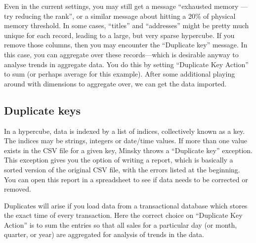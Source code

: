 Even in the current settings, you may still get a message ``exhausted
memory --- try reducing the rank'', or a similar message about hitting
a 20\% of physical memory threshold. In some cases, ``titles'' and
``addresses'' might be pretty much unique for each record, leading
to a large, but very sparse hypercube. If you remove those columns,
then you may encounter the ``Duplicate key'' message. In this case,
you can aggregate over these records---which is desirable anyway
to analyse trends in aggregate data. You do this by setting ``Duplicate
Key Action'' to sum (or perhaps average for this example). After
some additional playing around with dimensions to aggregate over,
we can get the data imported.
\begin{center}
\par\end{center}

\subsection{Duplicate keys}

In a hypercube, data is indexed by a list of indices, collectively
known as a key. The indices may be strings, integers or date/time
values. If more than one value exists in the CSV file for a given
key, Minsky throws a ``Duplicate key'' exception. This exception
gives you the option of writing a report, which is basically a sorted
version of the original CSV file, with the errors listed at the beginning.
You can open this report in a spreadsheet to see if data needs to
be corrected or removed.

Duplicates will arise if you load data from a transactional database
which stores the exact time of every transaction. Here the correct
choice on ``Duplicate Key Action'' is to sum the entries so that
all sales for a particular day (or month, quarter, or year) are aggregated
for analysis of trends in the data.

